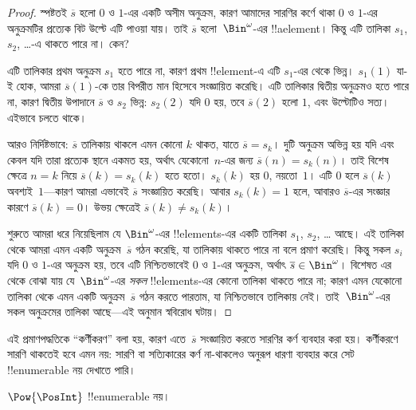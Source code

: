 \documentclass[../../../include/open-logic-section]{subfiles}
\begin{document}
\begin{proof}
স্পষ্টতই $\overline{s}$ হলো $0$ ও $1$-এর একটি অসীম অনুক্রম, কারণ আমাদের সারণির কর্ণে থাকা $0$ ও $1$-এর অনুক্রমটির প্রত্যেক বিট উল্টে এটি পাওয়া যায়। তাই $\overline{s}$ হলো~$\Bin^\omega$-এর !!a{element}। কিন্তু এটি তালিকা $s_1$, $s_2$, \dots{}-এ থাকতে পারে না। কেন?

এটি তালিকার প্রথম অনুক্রম $s_1$ হতে পারে না, কারণ প্রথম !!{element}-এ এটি $s_1$-এর থেকে ভিন্ন। $s_1(1)$ যা-ই হোক, আমরা $\overline{s}(1)$-কে তার বিপরীত মান হিসেবে সংজ্ঞায়িত করেছি। এটি তালিকার দ্বিতীয় অনুক্রমও হতে পারে না, কারণ দ্বিতীয় উপাদানে $\overline{s}$ ও $s_2$ ভিন্ন: $s_2(2)$ যদি $0$ হয়, তবে $\overline{s}(2)$ হলো $1$, এবং উল্টোটিও সত্য। এইভাবে চলতে থাকে।

আরও নির্দিষ্টভাবে: $\overline{s}$ তালিকায় থাকলে এমন কোনো $k$ থাকত, যাতে $\overline{s} = s_{k}$। দুটি অনুক্রম অভিন্ন হয় যদি এবং কেবল যদি তারা প্রত্যেক স্থানে একমত হয়, অর্থাৎ যেকোনো~$n$-এর জন্য $\overline{s}(n) = s_{k}(n)$। তাই বিশেষ ক্ষেত্রে $n = k$ নিয়ে $\overline{s}(k) = s_{k}(k)$ হতে হতো। $s_k(k)$ হয় $0$, নয়তো~$1$। এটি $0$ হলে $\overline{s}(k)$ অবশ্যই~$1$—কারণ আমরা এভাবেই $\overline{s}$ সংজ্ঞায়িত করেছি। আবার $s_k(k) = 1$ হলে, আবারও $\overline{s}$-এর সংজ্ঞার কারণে $\overline{s}(k) = 0$। উভয় ক্ষেত্রেই $\overline{s}(k) \neq s_{k}(k)$।

শুরুতে আমরা ধরে নিয়েছিলাম যে $\Bin^\omega$-এর !!{element}s-এর একটি তালিকা $s_1$, $s_2$, \dots{} আছে। এই তালিকা থেকে আমরা এমন একটি অনুক্রম~$\overline{s}$ গঠন করেছি, যা তালিকায় থাকতে পারে না বলে প্রমাণ করেছি। কিন্তু সকল $s_i$ যদি $0$ ও $1$-এর অনুক্রম হয়, তবে এটি নিশ্চিতভাবেই $0$ ও $1$-এর অনুক্রম, অর্থাৎ $\overline{s} \in \Bin^\omega$। বিশেষত এর থেকে বোঝা যায় যে~$\Bin^\omega$-এর \emph{সকল} !!{element}s-এর কোনো তালিকা থাকতে পারে না; কারণ এমন যেকোনো তালিকা থেকে এমন একটি অনুক্রম~$\overline{s}$ গঠন করতে পারতাম, যা নিশ্চিতভাবে তালিকায় নেই। তাই~$\Bin^\omega$-এর সকল অনুক্রমের তালিকা আছে—এই অনুমান স্ববিরোধ ঘটায়।
\end{proof}

\begin{explain}
এই প্রমাণপদ্ধতিকে ``কর্ণীকরণ'' বলা হয়, কারণ এতে~$\overline{s}$ সংজ্ঞায়িত করতে সারণির কর্ণ ব্যবহার করা হয়। কর্ণীকরণে সারণি থাকতেই হবে এমন নয়: সারণি বা সত্যিকারের কর্ণ না-থাকলেও অনুরূপ ধারণা ব্যবহার করে সেট !!{enumerable} নয় দেখাতে পারি।
\end{explain}

\begin{thm}
$\Pow{\PosInt}$ !!{enumerable} নয়।
\end{thm}
\end{document}
